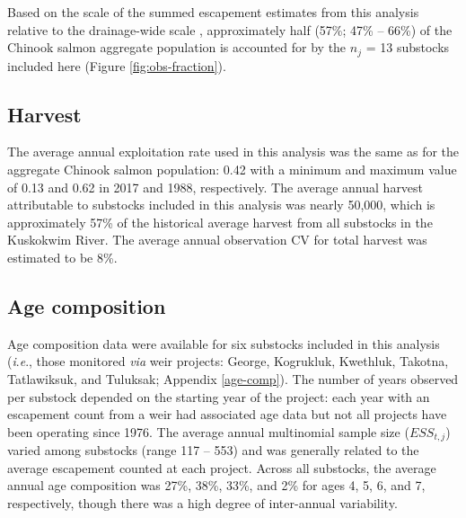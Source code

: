\documentclass[12pt,]{book}
\theoremstyle{definition}
\theoremstyle{definition}
\theoremstyle{definition}
\theoremstyle{remark}
\begin{document}
Based on the scale of the summed escapement estimates from this analysis
relative to the drainage-wide scale \citep[which includes monitored and
unmonitored substocks;][]{liller-etal-2018}, approximately half (57\%;
47\% -- 66\%) of the Chinook salmon aggregate population is accounted
for by the \(n_j\) = 13 substocks included here (Figure
\ref{fig:obs-fraction}).

\subsection{Harvest}\label{harv-data-results}

\noindent
The average annual exploitation rate used in this analysis was the same
as for the aggregate Chinook salmon population: 0.42 with a minimum and
maximum value of 0.13 and 0.62 in 2017 and 1988, respectively. The
average annual harvest attributable to substocks included in this
analysis was nearly 50,000, which is approximately 57\% of the
historical average harvest from all substocks in the Kuskokwim River.
The average annual observation CV for total harvest was estimated to be
8\%.

\subsection{Age composition}\label{age-data-results}

\noindent
Age composition data were available for six substocks included in this
analysis (\emph{i}.\emph{e}., those monitored \emph{via} weir projects:
George, Kogrukluk, Kwethluk, Takotna, Tatlawiksuk, and Tuluksak;
Appendix \ref{age-comp}). The number of years observed per substock
depended on the starting year of the project: each year with an
escapement count from a weir had associated age data but not all
projects have been operating since 1976. The average annual multinomial
sample size (\(ESS_{t,j}\)) varied among substocks (range 117 -- 553)
and was generally related to the average escapement counted at each
project. Across all substocks, the average annual age composition was
27\%, 38\%, 33\%, and 2\% for ages 4, 5, 6, and 7, respectively, though
there was a high degree of inter-annual variability.

\clearpage

\singlespacing
\end{document}
